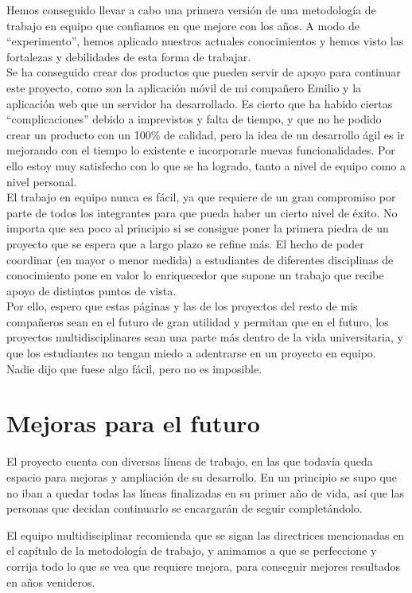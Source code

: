 Hemos conseguido llevar a cabo una primera versión de una metodología de trabajo en equipo que confiamos en que mejore con los años. A modo de ``experimento'', hemos aplicado nuestros actuales conocimientos y hemos visto las fortalezas y debilidades de esta forma de trabajar.\\

Se ha conseguido crear dos productos que pueden servir de apoyo para continuar este proyecto, como son la aplicación móvil de mi compañero Emilio y la aplicación web que un servidor ha desarrollado. Es cierto que ha habido ciertas ``complicaciones'' debido a imprevistos y falta de tiempo, y que no he podido crear un producto con un 100\% de calidad, pero la idea de un desarrollo ágil es ir mejorando con el tiempo lo existente e incorporarle nuevas funcionalidades. Por ello estoy muy satisfecho con lo que se ha logrado, tanto a nivel de equipo como a nivel personal.\\

El trabajo en equipo nunca es fácil, ya que requiere de un gran compromiso por parte de todos los integrantes para que pueda haber un cierto nivel de éxito. No importa que sea poco al principio si se consigue poner la primera piedra de un proyecto que se espera que a largo plazo se refine más. El hecho de poder coordinar (en mayor o menor medida) a estudiantes de diferentes disciplinas de conocimiento pone en valor lo enriquecedor que supone un trabajo que recibe apoyo de distintos puntos de vista.\\

Por ello, espero que estas páginas y las de los proyectos del resto de mis compañeros sean en el futuro de gran utilidad y permitan que en el futuro, los proyectos multidisciplinares sean una parte más dentro de la vida universitaria, y que los estudiantes no tengan miedo a adentrarse en un proyecto en equipo. Nadie dijo que fuese algo fácil, pero no es imposible.

\section{Mejoras para el futuro}
El proyecto cuenta con diversas líneas de trabajo, en las que todavía queda espacio para mejoras y ampliación de su desarrollo. En un principio se supo que no iban a quedar todas las líneas finalizadas en su primer año de vida, así que las personas que decidan continuarlo se encargarán de seguir completándolo.

El equipo multidisciplinar recomienda que se sigan las directrices mencionadas en el capítulo de la metodología de trabajo, y animamos a que se perfeccione y corrija todo lo que se vea que requiere mejora, para conseguir mejores resultados en años venideros.\\

